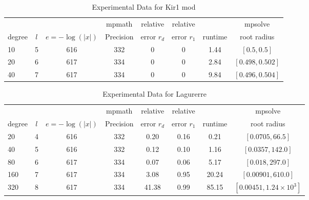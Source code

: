 \documentclass[sigconf]{acmart}
\begin{document}
\begin{table}[t]
\caption{Experimental Data for Kir1 mod}
\label{tab:kir1_mod}
\vskip 0.15in
\begin{center}
\begin{small}
\begin{sc}
\begin{tabular}{lccccccc}
\toprule
&  &  & mpmath & relative  & relative &  & mpsolve \\
degree  & $l$& $e=-\log(|x|)$& Precision &error $r_d$       & error $r_1$ &runtime& root radius\\
\midrule
   10 & 5 & 616 & 332 & 0 & 0 & 1.44 & $[0.5, 0.5]$\\
   20 & 6 & 617 & 334 & 0 & 0 & 2.84 & $[0.498, 0.502]$\\
   40 & 7 & 617 & 334 & 0 & 0 & 9.84 & $[0.496, 0.504]$\\
\bottomrule
\end{tabular}
\end{sc}
\end{small}
\end{center}
\vskip -0.1in
\end{table}


\begin{table}[t]
\caption{Experimental Data for  Lagurerre }
\label{tab:lagurerre}
\vskip 0.15in
\begin{center}
\begin{small}
\begin{sc}
\begin{tabular}{lccccccc}
\toprule
&  &  & mpmath & relative  & relative &  & mpsolve \\
degree  & $l$& $e=-\log(|x|)$& Precision &error $r_d$       & error $r_1$ &runtime& root radius\\
\midrule
   20 & 4 & 616 & 332 & 0.20 & 0.16 & 0.21 & $[0.0705,66.5]$ \\
   40 & 5 & 616 & 332 & 0.12 & 0.10 & 1.16 & $[0.0357,142.0]$\\
   80 & 6 & 617 & 334 & 0.07 & 0.06 & 5.17 & $[0.018,297.0]$\\
 160 & 7 & 617 & 334 & 3.08 & 0.95 & 20.24 & $[0.00901,610.0]$\\
 320 & 8 & 617 & 334 & 41.38 & 0.99 & 85.15 & $[0.00451,1.24 \times 10^3]$\\
\bottomrule
\end{tabular}
\end{sc}
\end{small}
\end{center}
\vskip -0.1in
\end{table}
\end{document}
